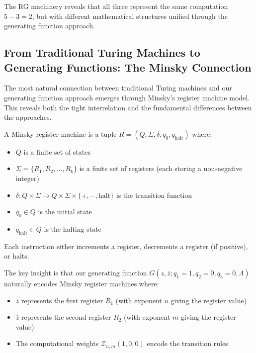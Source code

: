 The RG machinery reveals that all three represent the same computation $5-3=2$, but with different mathematical structures unified through the generating function approach.

\subsection{From Traditional Turing Machines to Generating Functions: The Minsky Connection}

The most natural connection between traditional Turing machines and our generating function approach emerges through Minsky's register machine model. This reveals both the tight interrelation and the fundamental differences between the approaches.

\begin{definition}
\label{def:minsky-machine}
A Minsky register machine is a tuple $R = (Q, \Sigma, \delta, q_0, q_{\text{halt}})$ where:
\begin{itemize}
\item $Q$ is a finite set of states
\item $\Sigma = \{R_1, R_2, \ldots, R_k\}$ is a finite set of registers (each storing a non-negative integer)
\item $\delta: Q \times \Sigma \to Q \times \Sigma \times \{+, -, \text{halt}\}$ is the transition function
\item $q_0 \in Q$ is the initial state
\item $q_{\text{halt}} \in Q$ is the halting state
\end{itemize}
Each instruction either increments a register, decrements a register (if positive), or halts.
\end{definition}

The key insight is that our generating function $G(z, \bar{z}; q_1=1, q_2=0, q_3=0, \Lambda)$ naturally encodes Minsky register machines where:
\begin{itemize}
\item $z$ represents the first register $R_1$ (with exponent $n$ giving the register value)
\item $\bar{z}$ represents the second register $R_2$ (with exponent $m$ giving the register value)
\item The computational weights $\mathcal{Z}_{n,m}(1,0,0)$ encode the transition rules
\end{itemize}

